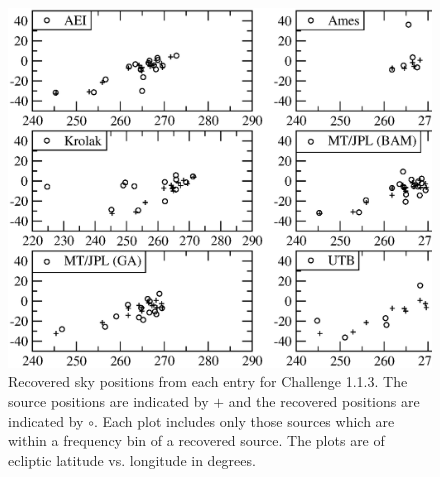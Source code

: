 \documentclass[12pt]{iopart}
\begin{document}
\begin{figure}
\includegraphics[clip=true,angle=0,width=1.0\textwidth]{1.1.3.skyposition6.eps}
\caption{\label{1.1.3skypo}Recovered sky positions from each entry for Challenge 1.1.3. The source positions are indicated by $+$ and the recovered positions are indicated by $\circ$. Each plot includes only those sources which are within a frequency bin of a recovered source. The plots are of ecliptic latitude vs. longitude in degrees.}
\end{figure}
\end{document}

